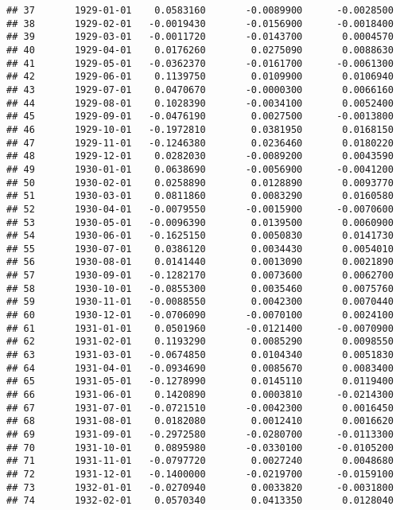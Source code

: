 \documentclass[
]{article}
\begin{document}
\begin{verbatim}
## 37       1929-01-01    0.0583160       -0.0089900      -0.0028500
## 38       1929-02-01   -0.0019430       -0.0156900      -0.0018400
## 39       1929-03-01   -0.0011720       -0.0143700       0.0004570
## 40       1929-04-01    0.0176260        0.0275090       0.0088630
## 41       1929-05-01   -0.0362370       -0.0161700      -0.0061300
## 42       1929-06-01    0.1139750        0.0109900       0.0106940
## 43       1929-07-01    0.0470670       -0.0000300       0.0066160
## 44       1929-08-01    0.1028390       -0.0034100       0.0052400
## 45       1929-09-01   -0.0476190        0.0027500      -0.0013800
## 46       1929-10-01   -0.1972810        0.0381950       0.0168150
## 47       1929-11-01   -0.1246380        0.0236460       0.0180220
## 48       1929-12-01    0.0282030       -0.0089200       0.0043590
## 49       1930-01-01    0.0638690       -0.0056900      -0.0041200
## 50       1930-02-01    0.0258890        0.0128890       0.0093770
## 51       1930-03-01    0.0811860        0.0083290       0.0160580
## 52       1930-04-01   -0.0079550       -0.0015900      -0.0070600
## 53       1930-05-01   -0.0096390        0.0139500       0.0060900
## 54       1930-06-01   -0.1625150        0.0050830       0.0141730
## 55       1930-07-01    0.0386120        0.0034430       0.0054010
## 56       1930-08-01    0.0141440        0.0013090       0.0021890
## 57       1930-09-01   -0.1282170        0.0073600       0.0062700
## 58       1930-10-01   -0.0855300        0.0035460       0.0075760
## 59       1930-11-01   -0.0088550        0.0042300       0.0070440
## 60       1930-12-01   -0.0706090       -0.0070100       0.0024100
## 61       1931-01-01    0.0501960       -0.0121400      -0.0070900
## 62       1931-02-01    0.1193290        0.0085290       0.0098550
## 63       1931-03-01   -0.0674850        0.0104340       0.0051830
## 64       1931-04-01   -0.0934690        0.0085670       0.0083400
## 65       1931-05-01   -0.1278990        0.0145110       0.0119400
## 66       1931-06-01    0.1420890        0.0003810      -0.0214300
## 67       1931-07-01   -0.0721510       -0.0042300       0.0016450
## 68       1931-08-01    0.0182080        0.0012410       0.0016620
## 69       1931-09-01   -0.2972580       -0.0280700      -0.0113300
## 70       1931-10-01    0.0895980       -0.0330100      -0.0105200
## 71       1931-11-01   -0.0797720        0.0027240       0.0048680
## 72       1931-12-01   -0.1400000       -0.0219700      -0.0159100
## 73       1932-01-01   -0.0270940        0.0033820      -0.0031800
## 74       1932-02-01    0.0570340        0.0413350       0.0128040

\end{verbatim}
\end{document}
